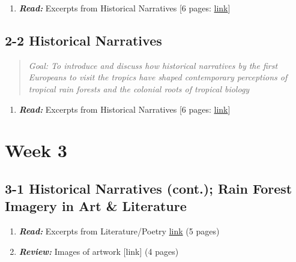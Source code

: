 \documentclass[
  10pt,
  letterpaper,
  oneside,
  open=any]{scrbook}
\providecommand{\tightlist}{%
  \setlength{\itemsep}{0pt}\setlength{\parskip}{0pt}}\usepackage{longtable,booktabs,array}
\begin{document}
\begin{enumerate}
\def\labelenumi{\arabic{enumi}.}
\tightlist
\item
  \textbf{\emph{Read:}} Excerpts from Historical Narratives {[}6 pages:
  \href{https://ids2935.netlify.app/uploads/historical_narratives.pdf}{link}{]}
\end{enumerate}

\subsection*{2-2 Historical Narratives}\label{historical-narratives-1}

\begin{quote}
\emph{Goal: To introduce and discuss how historical narratives by the
first Europeans to visit the tropics have shaped contemporary
perceptions of tropical rain forests and the colonial roots of tropical
biology}
\end{quote}

\begin{enumerate}
\def\labelenumi{\arabic{enumi}.}
\tightlist
\item
  \textbf{\emph{Read:}} Excerpts from Historical Narratives {[}6 pages:
  \href{https://ids2935.netlify.app/uploads/historical_narratives.pdf}{link}{]}
\end{enumerate}

\section{Week 3}\label{week-3}

\subsection*{3-1 Historical Narratives (cont.); Rain Forest Imagery in
Art \&
Literature}\label{historical-narratives-cont.-rain-forest-imagery-in-art-literature}

\begin{enumerate}
\def\labelenumi{\arabic{enumi}.}
\item
  \textbf{\emph{Read:}} Excerpts from Literature/Poetry
  \href{https://ids2935.netlify.app/03_trf_culture/lit_poetry.pdf}{link}
  (5 pages)
\item
  \textbf{\emph{Review:}} Images of artwork {[}link{]} (4 pages)
\end{enumerate}
\end{document}
